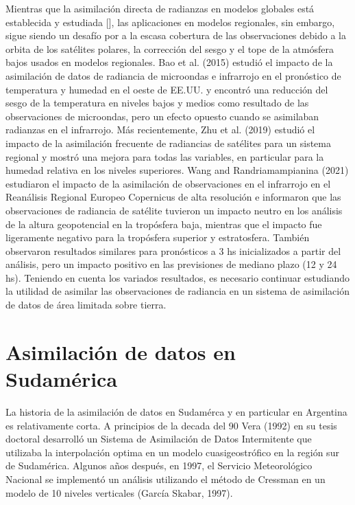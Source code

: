 \documentclass[12pt,twoside]{reedthesis}
\begin{document}
Mientras que la asimilación directa de radianzas en modelos globales está establecida y estudiada {[}{]}, las aplicaciones en modelos regionales, sin embargo, sigue siendo un desafío por a la escasa cobertura de las observaciones debido a la orbita de los satélites polares, la corrección del sesgo y el tope de la atmósfera bajos usados en modelos regionales. Bao et al. (2015) estudió el impacto de la asimilación de datos de radiancia de microondas e infrarrojo en el pronóstico de temperatura y humedad en el oeste de EE.UU. y encontró una reducción del sesgo de la temperatura en niveles bajos y medios como resultado de las observaciones de microondas, pero un efecto opuesto cuando se asimilaban radianzas en el infrarrojo. Más recientemente, Zhu et al. (2019) estudió el impacto de la asimilación frecuente de radiancias de satélites para un sistema regional y mostró una mejora para todas las variables, en particular para la humedad relativa en los niveles superiores. Wang and Randriamampianina (2021) estudiaron el impacto de la asimilación de observaciones en el infrarrojo en el Reanálisis Regional Europeo Copernicus de alta resolución e informaron que las observaciones de radiancia de satélite tuvieron un impacto neutro en los análisis de la altura geopotencial en la tropósfera baja, mientras que el impacto fue ligeramente negativo para la tropósfera superior y estratosfera. También observaron resultados similares para pronósticos a 3 hs inicializados a partir del análisis, pero un impacto positivo en las previsiones de mediano plazo (12 y 24 hs). Teniendo en cuenta los variados resultados, es necesario continuar estudiando la utilidad de asimilar las observaciones de radiancia en un sistema de asimilación de datos de área limitada sobre tierra.

\hypertarget{asimilaciuxf3n-de-datos-en-sudamuxe9rica}{%
\section{Asimilación de datos en Sudamérica}\label{asimilaciuxf3n-de-datos-en-sudamuxe9rica}}

La historia de la asimilación de datos en Sudamérca y en particular en Argentina es relativamente corta. A principios de la decada del 90 Vera (1992) en su tesis doctoral desarrolló un Sistema de Asimilación de Datos Intermitente que utilizaba la interpolación optima en un modelo cuasigeostrófico en la región sur de Sudamérica. Algunos años después, en 1997, el Servicio Meteorológico Nacional se implementó un
análisis utilizando el método de Cressman en un modelo de 10 niveles verticales (García Skabar, 1997).
\end{document}
